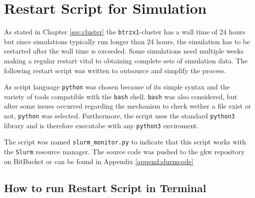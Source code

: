 \section{Restart Script for Simulation}
\label{sec:restartscript}

As stated in Chapter \ref{sec:cluster} the \texttt{btrzx1}-cluster has a wall time of 24 hours but since simulations typically run longer than 24 hours, the simulation has to be restarted after the wall time is exceeded. Some simulations need multiple weeks making a regular restart vital to obtaining complete sets of simulation data. The following restart script was written to outsource and simplify the process.

As script language \texttt{python} was chosen because of its simple syntax and the variety of tools compatible with the \texttt{bash} shell. \texttt{bash} was also considered, but after some issues occurred regarding the mechanism to check wether a file exist or not, \texttt{python} was selected. Furthermore, the script uses the standard \texttt{python3} library and is therefore executabe with any \texttt{python3} enviroment.

The script was named \texttt{slurm\_monitor.py} to indicate that this script works with the \texttt{Slurm} resource manager. The source code was pushed to the gkw repository on BitBucket \cite{slurmmonitor} or can be found in Appendix \ref{append:slurmcode}

\subsection{How to run Restart Script in Terminal}
\label{sub:codeRun}

